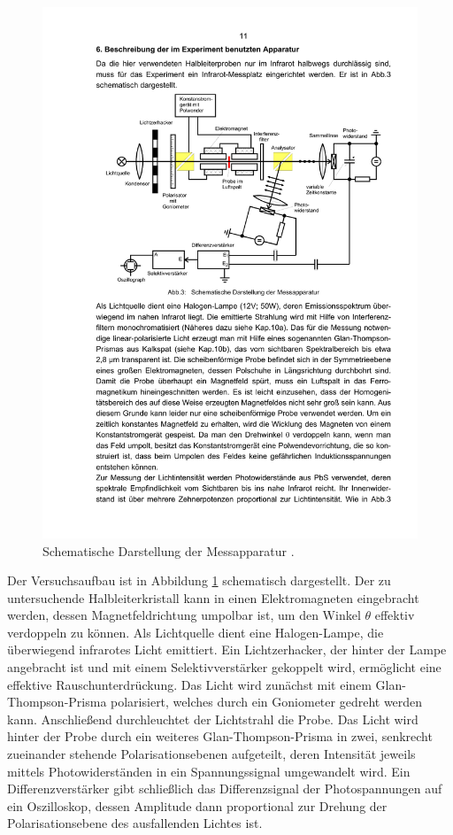 \begin{figure}[h]
    \centering
    \includegraphics[width=0.9\linewidth]{img/aufbau.pdf}
    \caption{
        Schematische Darstellung der Messapparatur \cite{V46}.
    }
    \label{fig:aufbau}
\end{figure}
Der Versuchsaufbau ist in Abbildung \ref{fig:aufbau} schematisch dargestellt.
Der zu untersuchende Halbleiterkristall kann in einen Elektromagneten
eingebracht werden,
dessen Magnetfeldrichtung umpolbar ist, um den Winkel $\theta$
effektiv verdoppeln zu können.
Als Lichtquelle dient eine Halogen-Lampe, die überwiegend infrarotes Licht
emittiert.
Ein Lichtzerhacker, der hinter der Lampe angebracht ist und mit einem
Selektivverstärker gekoppelt wird, ermöglicht eine effektive
Rauschunterdrückung.
Das Licht wird zunächst mit einem Glan-Thompson-Prisma polarisiert, welches
durch ein Goniometer gedreht werden kann.
Anschließend durchleuchtet der Lichtstrahl die Probe.
Das Licht wird hinter der Probe durch ein weiteres Glan-Thompson-Prisma in
zwei, senkrecht zueinander stehende Polarisationsebenen aufgeteilt, deren
Intensität jeweils mittels Photowiderständen in ein Spannungssignal
umgewandelt wird.
Ein Differenzverstärker gibt schließlich das Differenzsignal der
Photospannungen auf ein Oszilloskop, dessen Amplitude dann proportional zur
Drehung der Polarisationsebene des ausfallenden Lichtes ist.

